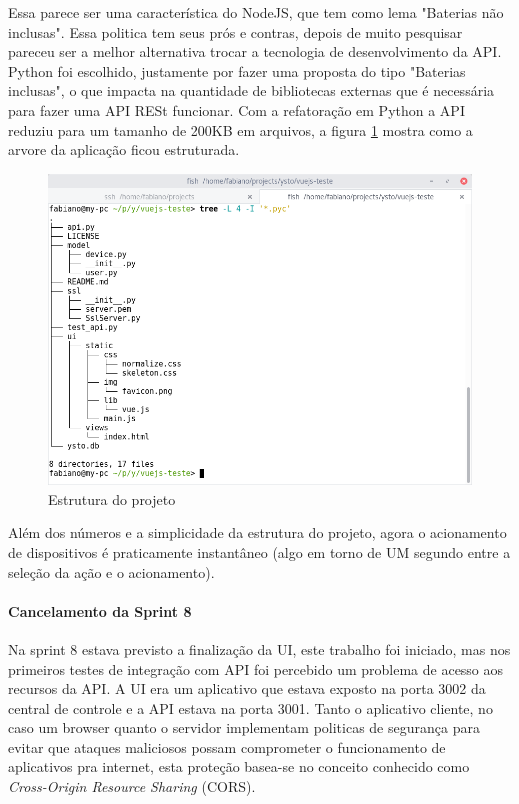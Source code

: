 Essa parece ser uma característica do NodeJS, que tem como lema "Baterias não inclusas". Essa politica tem seus prós e contras, depois de muito pesquisar pareceu ser a melhor alternativa trocar a tecnologia de desenvolvimento da API. Python foi escolhido, justamente por fazer uma proposta do tipo "Baterias inclusas", o que impacta na quantidade de bibliotecas externas que é necessária para fazer uma API RESt funcionar. Com a refatoração em Python a API reduziu para um tamanho de 200KB em arquivos, a figura \ref{tree-view-project} mostra como a arvore da aplicação ficou estruturada.

\begin{figure}[H]
\caption{\label{tree-view-project} Estrutura do projeto}
\includegraphics[scale=0.4]{img/tree-view.png}
\end{figure}

Além dos números e a simplicidade da estrutura do projeto, agora o acionamento de dispositivos é praticamente instantâneo (algo em torno de UM segundo entre a seleção da ação e o acionamento).

\paragraph{Cancelamento da Sprint 8}
Na sprint 8 estava previsto a finalização da UI, este trabalho foi iniciado, mas nos primeiros testes de integração com API foi percebido um problema de acesso aos recursos da API. A UI era um aplicativo que estava exposto na porta 3002 da central de controle e a API estava na porta 3001. Tanto o aplicativo cliente, no caso um browser quanto o servidor implementam politicas de segurança para evitar que ataques maliciosos possam comprometer o funcionamento de aplicativos pra internet, esta proteção basea-se no conceito conhecido como \textit{Cross-Origin Resource Sharing} (CORS).

